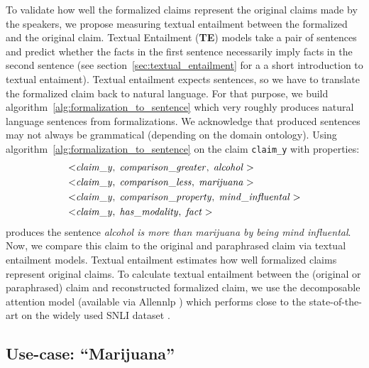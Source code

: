 To validate how well the formalized claims represent the original claims
made by the speakers, we propose measuring textual entailment between the formalized 
and the original claim. Textual Entailment (\textbf{TE}) models take a pair 
of sentences and predict whether the facts in the first sentence necessarily imply
facts in the second sentence (see section~\ref{sec:textual_entailment} for a
a short introduction to textual entaiment). Textual entailment expects 
sentences, so we have to translate the formalized claim back to natural language. 
For that purpose, we build algorithm~\ref{alg:formalization_to_sentence} which 
very roughly produces natural language sentences from formalizations. 
We acknowledge that produced sentences may not always be grammatical (depending on the
domain ontology). Using algorithm~\ref{alg:formalization_to_sentence} on the claim 
\texttt{claim\_y} with properties:
\begin{align*}
	< & \mathit{claim\_y}, \hspace{0.1cm} \mathit{comparison\_greater}, \hspace{0.1cm}
	\mathit{alcohol} > \\
	< & \mathit{claim\_y}, \hspace{0.1cm} \mathit{comparison\_less}, \hspace{0.1cm}
	\mathit{marijuana} >  \\
	< & \mathit{claim\_y}, \hspace{0.1cm} \mathit{comparison\_property}, \hspace{0.1cm}
	\mathit{mind\_influental} >  \\
	< & \mathit{claim\_y}, \hspace{0.1cm} \mathit{has\_modality}, \hspace{0.1cm}
	\mathit{fact} > 
\end{align*}
produces the sentence \emph{alcohol is more than marijuana by being mind influental}.
Now, we compare this claim to the original and paraphrased claim via 
textual entailment models. Textual entailment estimates how well 
formalized claims represent original claims. To calculate
textual entailment between the (original or paraphrased) claim and reconstructed
formalized claim, we use the decomposable attention model \citep{parikh2016decomposable}
(available via Allennlp \citep{gardner2018allennlp}) which performs
close to the state-of-the-art on the widely used SNLI dataset \citep{bowman2015large}.

\subsection{Use-case: ``Marijuana'' }
\label{sec:usecase_ontology}


